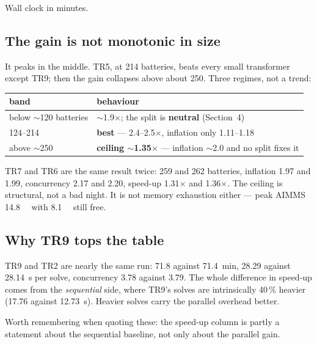 \documentclass[11pt,a4paper]{article}
\begin{document}
Wall clock in minutes.

\subsection{The gain is not monotonic in size}

It peaks in the middle. TR5, at 214 batteries, beats every small transformer
except TR9; then the gain collapses above about 250. Three regimes, not a trend:

\begin{center}
\begin{tabular}{@{}p{} p{}@{}}
\toprule
\textbf{band} & \textbf{behaviour} \\
\midrule
below $\sim$120 batteries & $\sim$1.9$\times$; the split is \textbf{neutral} (Section~4) \\
124--214                  & \textbf{best} --- 2.4--2.5$\times$, inflation only 1.11--1.18 \\
above $\sim$250           & \textbf{ceiling $\sim$1.35$\times$} --- inflation $\sim$2.0 and no split fixes it \\
\bottomrule
\end{tabular}
\end{center}

TR7 and TR6 are the same result twice: 259 and 262 batteries, inflation 1.97 and
1.99, concurrency 2.17 and 2.20, speed-up 1.31$\times$ and 1.36$\times$. The
ceiling is structural, not a bad night. It is not memory exhaustion either ---
peak AIMMS \SI{14.8}{\giga\byte} with \SI{8.1}{\giga\byte} still free.

\subsection{Why TR9 tops the table}

TR9 and TR2 are nearly the same run: 71.8 against \SI{71.4}{\minute}, 28.29
against \SI{28.14}{\second} per solve, concurrency 3.78 against 3.79. The whole
difference in speed-up comes from the \emph{sequential} side, where TR9's solves
are intrinsically 40\,\% heavier (17.76 against \SI{12.73}{\second}). Heavier
solves carry the parallel overhead better.

\begin{warnbox}
Worth remembering when quoting these: the speed-up column is partly a statement
about the sequential baseline, not only about the parallel gain.
\end{warnbox}
\end{document}
